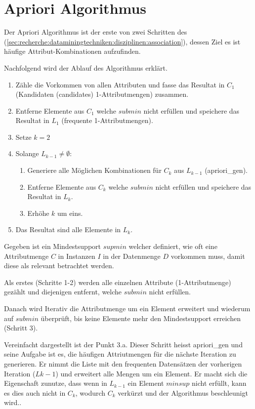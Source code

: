 \section{Apriori Algorithmus}
\label{sec:konzept:apriori}
Der Apriori Algorithmus ist der erste von zwei Schritten des  (\cref{sec:recherche:dataminingtechniken:disziplinen:association}), dessen Ziel es ist häufige Attribut-Kombinationen aufzufinden. 

Nachfolgend wird der Ablauf des Algorithmus erklärt.
\begin{enumerate}
\item Zähle die Vorkommen von allen Attributen und fasse das Resultat in $C_1$ (Kandidaten (candidates) 1-Attributmengen) zusammen.
\item Entferne Elemente aus $C_1$ welche $submin$ nicht erfüllen und speichere das Resultat in $L_1$ (frequente 1-Attributmengen).
\item Setze $k=2$
\item Solange $L_{k-1} \neq \emptyset$:
	\begin {enumerate}
	\item Generiere alle Möglichen Kombinationen für $C_k$ aus $L_{k-1}$ (apriori\_gen).
	\item Entferne Elemente aus $C_k$ welche $submin$ nicht erfüllen und speichere das Resultat in $L_k$.
	\item Erhöhe $k$ um eins.
\end{enumerate}
\item Das Resultat sind alle Elemente in $L_k$.
\end{enumerate}

Gegeben ist ein Mindestsupport $supmin$ welcher definiert, wie oft eine Attributmenge $C$ in Instanzen $I$ in der Datenmenge $D$ vorkommen muss, damit diese als relevant betrachtet werden. 

Als erstes (Schritte 1-2) werden alle einzelnen Attribute (1-Attributmenge) gezählt und diejenigen entfernt, welche $submin$ nicht erfüllen.

Danach wird Iterativ die Attributmenge um ein Element erweitert und wiederum auf $submin$ überprüft, bis keine Elemente mehr den Mindestsupport erreichen (Schritt 3).

Vereinfacht dargestellt ist der Punkt 3.a. Dieser Schritt heisst apriori\_gen und seine Aufgabe ist es, die häufigen Attriutmengen für die nächste Iteration zu generieren. Er nimmt die Liste mit den frequenten Datensätzen der vorherigen Iteration ($L{k-1}$) und erweitert alle Mengen um ein Element. Er macht sich die Eigenschaft zunutze, dass wenn in $L_{k-1}$ ein Element $minsup$ nicht erfüllt, kann es dies auch nicht in $C_k$, wodurch $C_k$ verkürzt und der Algorithmus beschleunigt wird..

